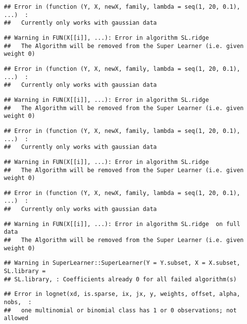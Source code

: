 \documentclass[
]{article}
\begin{document}
\begin{verbatim}
## Error in (function (Y, X, newX, family, lambda = seq(1, 20, 0.1), ...)  : 
##   Currently only works with gaussian data
\end{verbatim}

\begin{verbatim}
## Warning in FUN(X[[i]], ...): Error in algorithm SL.ridge 
##   The Algorithm will be removed from the Super Learner (i.e. given weight 0)
\end{verbatim}

\begin{verbatim}
## Error in (function (Y, X, newX, family, lambda = seq(1, 20, 0.1), ...)  : 
##   Currently only works with gaussian data
\end{verbatim}

\begin{verbatim}
## Warning in FUN(X[[i]], ...): Error in algorithm SL.ridge 
##   The Algorithm will be removed from the Super Learner (i.e. given weight 0)
\end{verbatim}

\begin{verbatim}
## Error in (function (Y, X, newX, family, lambda = seq(1, 20, 0.1), ...)  : 
##   Currently only works with gaussian data
\end{verbatim}

\begin{verbatim}
## Warning in FUN(X[[i]], ...): Error in algorithm SL.ridge 
##   The Algorithm will be removed from the Super Learner (i.e. given weight 0)
\end{verbatim}

\begin{verbatim}
## Error in (function (Y, X, newX, family, lambda = seq(1, 20, 0.1), ...)  : 
##   Currently only works with gaussian data
\end{verbatim}

\begin{verbatim}
## Warning in FUN(X[[i]], ...): Error in algorithm SL.ridge  on full data 
##   The Algorithm will be removed from the Super Learner (i.e. given weight 0)
\end{verbatim}

\begin{verbatim}
## Warning in SuperLearner::SuperLearner(Y = Y.subset, X = X.subset, SL.library =
## SL.library, : Coefficients already 0 for all failed algorithm(s)
\end{verbatim}

\begin{verbatim}
## Error in lognet(xd, is.sparse, ix, jx, y, weights, offset, alpha, nobs,  : 
##   one multinomial or binomial class has 1 or 0 observations; not allowed
\end{verbatim}
\end{document}
